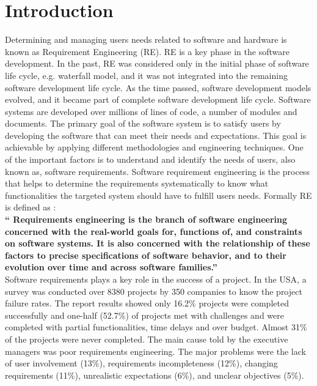 \section{Introduction}

Determining and managing users needs related to software and hardware is known as
Requirement Engineering (RE). RE is a key phase in the software development. In the past,
RE was considered only in the initial phase of software life cycle, e.g. waterfall model, and it was
not integrated into the remaining software development life cycle. As the time passed, software
development models evolved, and it became part of complete software development life
cycle.
Software systems are developed over millions of lines of code, a number of modules and
documents. The primary goal of the software system is to satisfy users by developing the
software that can meet their needs and expectations. This goal is achievable by applying
different methodologies and engineering techniques. One of the important factors is to understand and
identify the needs of users, also known as, software requirements. Software requirement
engineering is the process that helps to determine the requirements systematically to know
what functionalities the targeted system should have to fulfill users needs. Formally RE is
defined as \cite {Zave:1997} :\\
\textbf{ `` Requirements engineering is the branch of software engineering concerned with the real-world
goals for, functions of, and constraints on software systems. It is also concerned with the
relationship of these factors to precise specifications of software behavior, and to their evolution
over time and across software families.''} \\

	Software requirements plays a key role in the success of a project. In the USA, a survey was
conducted over 8380 projects by 350 companies to know the project failure rates. The report
\cite{StandishReport} results showed only 16.2\% projects were completed successfully and one-half (52.7\%)
of projects met with challenges and were completed with partial functionalities, time delays and
over budget. Almost 31\% of the projects were never completed. The main cause told by the
executive managers was poor requirements engineering. The major problems were the lack of user
involvement (13\%), requirements incompleteness (12\%), changing requirements (11\%),
unrealistic expectations (6\%), and unclear objectives (5\%). \\

